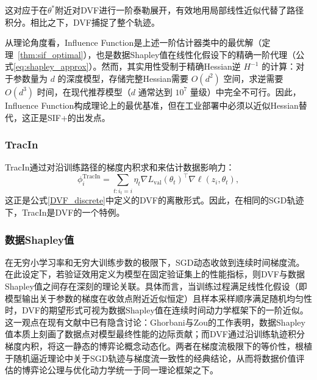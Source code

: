 这对应于在\(\theta^*\)附近对DVF进行一阶泰勒展开，有效地用局部线性近似代替了路径积分。相比之下，DVF捕捉了整个轨迹。

从理论角度看，Influence Function是上述一阶估计器类中的最优解（定理~\ref{thm:sif_optimal}），也是数据Shapley值在线性化假设下的精确一阶代理（公式\eqref{eq:shapley_approx}）。然而，其实用性受制于精确Hessian逆 $H^{-1}$ 的计算：对于参数量为 $d$ 的深度模型，存储完整Hessian需要 $O(d^2)$ 空间，求逆需要 $O(d^3)$ 时间，在现代推荐模型（$d$ 通常达到 $10^7$ 量级）中完全不可行。因此，Influence Function构成理论上的最优基准，但在工业部署中必须以近似Hessian替代，这正是SIF+的出发点。

\subsubsection{TracIn}
TracIn\cite{TracIn}通过对沿训练路径的梯度内积求和来估计数据影响力：
\[
\phi_i^{\text{TracIn}} = \sum_{t: i_t = i} \eta_t \nabla L_{\text{val}}(\theta_t)^{\top} \nabla \ell(z_i, \theta_t),
\]
这正是公式\eqref{DVF_discrete}中定义的DVF的离散形式。因此，在相同的SGD轨迹下，TracIn是DVF的一个特例。

\subsubsection{数据Shapley值}
在无穷小学习率和无穷大训练步数的极限下，SGD动态收敛到连续时间梯度流\cite{StochasticApproximation}。在此设定下，若验证效用定义为模型在固定验证集上的性能指标，则DVF与数据Shapley值之间存在深刻的理论关联。具体而言，当训练过程满足线性化假设（即模型输出关于参数的梯度在收敛点附近近似恒定）且样本采样顺序满足随机均匀性时，DVF的期望形式可视为数据Shapley值在连续时间动力学框架下的一阶近似。这一观点在现有文献中已有隐含讨论\cite{ghorbani2019data}：Ghorbani与Zou的工作表明，数据Shapley值本质上刻画了数据点对模型最终性能的边际贡献；而DVF通过沿训练轨迹积分梯度内积，将这一静态的博弈论概念动态化。两者在梯度流极限下的等价性，根植于随机逼近理论中关于SGD轨迹与梯度流一致性的经典结论\cite{StochasticApproximation}，从而将数据价值评估的博弈论公理与优化动力学统一于同一理论框架之下。

